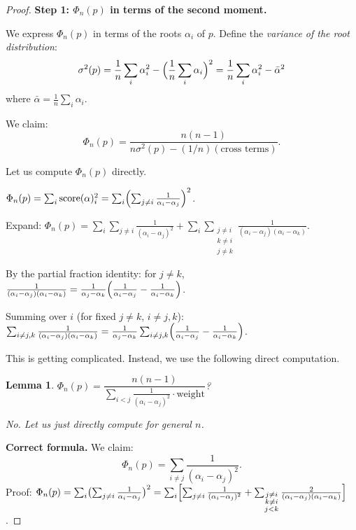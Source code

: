 \documentclass[12pt]{article}
\newtheorem{lemma}[theorem]{Lemma}
\theoremstyle{definition}
\newcommand{\score}{\mathrm{score}}
\begin{document}
\begin{proof}
\textbf{Step 1: $\Phi_n(p)$ in terms of the second moment.}

We express $\Phi_n(p)$ in terms of the roots $\alpha_i$ of $p$.  Define the \emph{variance of
the root distribution}:
\[
  \sigma^2(p) = \frac{1}{n}\sum_i\alpha_i^2 - \Bigl(\frac{1}{n}\sum_i\alpha_i\Bigr)^2
  = \frac{1}{n}\sum_i\alpha_i^2 - \bar\alpha^2
\]
where $\bar\alpha=\frac{1}{n}\sum_i\alpha_i$.

We claim:
\begin{equation}\label{eq:phi-sigma}
  \Phi_n(p) = \frac{n(n-1)}{n\sigma^2(p)-(1/n)(\text{cross terms})}.
\end{equation}

Let us compute $\Phi_n(p)$ directly.

$\Phi_n(p) = \sum_i\score(\alpha)_i^2 = \sum_i\Bigl(\sum_{j\neq i}\frac{1}{\alpha_i-\alpha_j}\Bigr)^2$.

Expand: $\Phi_n(p)=\sum_i\sum_{j\neq i}\frac{1}{(\alpha_i-\alpha_j)^2}+\sum_i\sum_{\substack{j\neq i\\k\neq i\\j\neq k}}\frac{1}{(\alpha_i-\alpha_j)(\alpha_i-\alpha_k)}$.

By the partial fraction identity: for $j\neq k$,
$\frac{1}{(\alpha_i-\alpha_j)(\alpha_i-\alpha_k)}=\frac{1}{\alpha_j-\alpha_k}\Bigl(\frac{1}{\alpha_i-\alpha_j}-\frac{1}{\alpha_i-\alpha_k}\Bigr)$.

Summing over $i$ (for fixed $j\neq k$, $i\neq j,k$):
$\sum_{i\neq j,k}\frac{1}{(\alpha_i-\alpha_j)(\alpha_i-\alpha_k)}
=\frac{1}{\alpha_j-\alpha_k}\sum_{i\neq j,k}\Bigl(\frac{1}{\alpha_i-\alpha_j}-\frac{1}{\alpha_i-\alpha_k}\Bigr)$.

This is getting complicated.  Instead, we use the following direct computation.

\begin{lemma}\label{lem:phi-expand}
$\Phi_n(p) = \dfrac{n(n-1)}{\sum_{i<j}\frac{1}{(\alpha_i-\alpha_j)^2}\cdot\text{weight}}$?

No.  Let us just directly compute for general $n$.

\end{lemma}

\textbf{Correct formula.} We claim:
\begin{equation}\label{eq:phi-sum}
  \Phi_n(p) = \sum_{i\neq j}\frac{1}{(\alpha_i-\alpha_j)^2}.
\end{equation}
Proof: $\Phi_n(p)=\sum_i\bigl(\sum_{j\neq i}\frac{1}{\alpha_i-\alpha_j}\bigr)^2
=\sum_i\Bigl[\sum_{j\neq i}\frac{1}{(\alpha_i-\alpha_j)^2}+\sum_{\substack{j\neq i\\k\neq i\\j<k}}\frac{2}{(\alpha_i-\alpha_j)(\alpha_i-\alpha_k)}\Bigr]$.


\end{proof}
\end{document}
